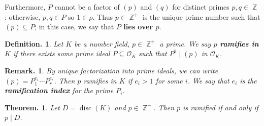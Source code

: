 \documentclass[11pt, a4paper]{memoir}
\DeclareMathOperator{\Z}{{\mathbb{Z}}}
\theoremstyle{change}
\newtheorem{theorem}{Theorem.}[section]
\theoremstyle{plain}
\theoremstyle{nonumberplain}
\newtheorem{definition}{Definition.}
\newtheorem{remark}{Remark.}
\DeclareMathOperator{\disc}{disc}
\newcommand{\mbf}[1]{{\boldmath\bfseries #1}}
\numberwithin{equation}{section}
\begin{document}
Furthermore, $P$ cannot be a factor of $(p)$ and $(q)$ for distinct primes $p,q\in\Z$: otherwise, $p,q\in P$ so $1\in\rho$.
Thus $p\in \Z^+$ is the unique prime number such that $(p)\subseteq P$; in this case, we say that \mbf{$P$ lies over $p$}.
\begin{definition}
    Let $K$ be a number field, $p\in\Z^+$ a prime.
    We say \mbf{$p$ ramifies in $K$} if there exists some prime ideal $P\subseteq\mathcal{O}_K$ such that $P^2\mid(p)$ in $\mathcal{O}_K$.
\end{definition}
\begin{remark}
    By unique factorization into prime ideals, we can write $(p)=P_1^{e_1}\cdots P_r^{e_r}$.
    Then $p$ ramifies in $K$ if $e_i>1$ for some $i$.
    We say that $e_i$ is the \mbf{ramification index} for the prime $P_i$.
\end{remark}
\begin{theorem}
    Let $D=\disc(K)$ and $p\in\Z^+$.
    Then $p$ is ramified if and only if $p\mid D$.
\end{theorem}
\end{document}
